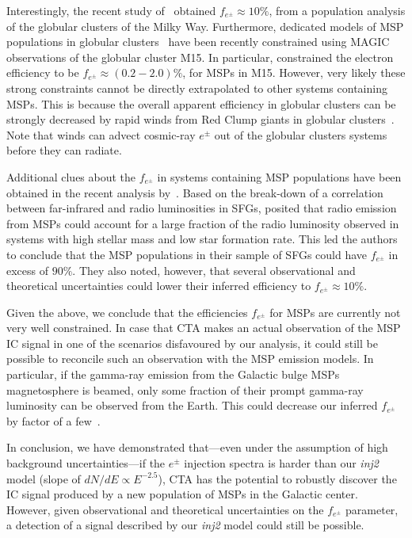 \documentclass[doublespace,nopageskip]{VTthesis} %
\begin{document}
Interestingly, the recent study of~\citet{2021MNRAS.507.5161S} obtained $f_{e^\pm}\approx 10\%$, from a population analysis of the globular clusters of the Milky Way. Furthermore, dedicated models of MSP populations in globular clusters~\citep{2016MNRAS.458.1083B,2018MNRAS.473..897N} have been recently constrained using MAGIC observations of the globular cluster M15. In particular, \cite{2019MNRAS.484.2876M} constrained the electron efficiency to be $f_{e^{\pm}}\approx (0.2-2.0)\%$, for MSPs in M15. However, very likely these strong constraints cannot be directly extrapolated to other systems containing MSPs. This is because the overall apparent efficiency in globular clusters can be strongly decreased by rapid winds from Red Clump giants in globular clusters~\citep{2016MNRAS.458.1083B}. Note that winds can advect cosmic-ray $e^\pm$ out of the globular clusters systems before they can radiate.

Additional clues about the $f_{e^{\pm}}$ in systems containing MSP populations have been obtained in the recent analysis by~\citet{2021PhRvD.103h3017S}. 
%
Based on the break-down of a correlation 
between far-infrared and radio luminosities in SFGs, \citet{2021PhRvD.103h3017S} posited that radio emission from MSPs could account for a large fraction of the radio luminosity observed in systems with high stellar mass and low star formation rate. This led the authors to conclude that the MSP populations in their sample of SFGs could have $f_{e^{\pm}}$ in excess of $90\%$. They also noted, however, that several observational and theoretical uncertainties could lower their inferred efficiency to $f_{e^{\pm}}\approx 10\%$. 

 

Given the above, 
we conclude that the efficiencies $f_{e^{\pm}}$ for MSPs are currently not very well constrained. In case that CTA makes an actual observation of the MSP IC signal in one of the scenarios disfavoured by our analysis, it could still be possible to reconcile such an observation with the MSP emission models. In particular, if the gamma-ray emission from the Galactic bulge MSPs magnetosphere is beamed, only some fraction of their prompt gamma-ray luminosity can be observed from the Earth. This could decrease our inferred $f_{e^{\pm}}$ by factor of a few~\citep{2021PhRvD.103h3017S}.  

In conclusion, we have demonstrated that---even under the assumption of high background uncertainties---if the $e^\pm$ injection spectra is harder than our \textit{inj2} model (slope of $dN/dE \propto E^{-2.5}$),  CTA has the potential to robustly discover the IC signal produced by a new population of MSPs in the Galactic center. However, given observational and theoretical uncertainties on the $f_{e^{\pm}}$ parameter, a detection of a signal described by our \textit{inj2} model could still be possible. 
\end{document}
